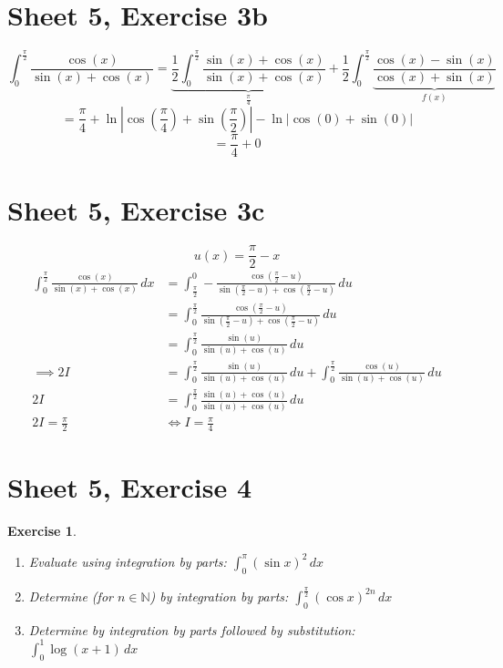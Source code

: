 \documentclass{article}
\newtheorem{ex}{Exercise} %
\newcommand{\card}[1]{\left|#1\right|}
\begin{document}
\section{Sheet 5, Exercise 3b}
\[
  \int_0^{\frac\pi2} \frac{\cos(x)}{\sin(x) + \cos(x)} = \underbrace{\frac12 \int_0^{\frac\pi2} \frac{\sin(x) + \cos(x)}{\sin(x) + \cos(x)}}_{\frac\pi4} + \frac12 \int_0^{\frac\pi2} \underbrace{\frac{\cos(x) - \sin(x)}{\cos(x) + \sin(x)}}_{f(x)}
\] \[
  = \frac\pi4 + \ln{\card{\cos(\frac\pi4) + \sin(\frac\pi2)} - \ln\card{\cos(0) + \sin(0)}}
\] \[
  = \frac\pi4 + 0
\]

\section{Sheet 5, Exercise 3c}
\[ u(x) = \frac\pi2 - x \]
\begin{align*}
  \int_0^{\frac\pi2} \frac{\cos(x)}{\sin(x) + \cos(x)} \, dx
  &= \int_{\frac\pi2}^0 -\frac{\cos(\frac\pi2 - u)}{\sin(\frac\pi2 - u) + \cos(\frac\pi2 - u)} \, du \\
  &= \int_0^{\frac\pi2} \frac{\cos(\frac\pi2 - u)}{\sin(\frac\pi2 - u) + \cos(\frac\pi2 - u)} \, du \\
  &= \int_0^{\frac\pi2} \frac{\sin(u)}{\sin(u) + \cos(u)} \, du \\
  \implies 2I &= \int_0^{\frac\pi2} \frac{\sin(u)}{\sin(u) + \cos(u)} \, du + \int_0^{\frac\pi2} \frac{\cos(u)}{\sin(u) + \cos(u)} \, du \\
  2I &= \int_0^{\frac\pi2} \frac{\sin(u) + \cos(u)}{\sin(u) + \cos(u)} \, du \\
  2I = \frac\pi2 &\iff I = \frac\pi4
\end{align*}

\section{Sheet 5, Exercise 4}
\begin{ex}
  \begin{enumerate}
    \item Evaluate using integration by parts: $\int_0^\pi (\sin{x})^2 \, dx$
    \item Determine (for $n \in \mathbb N$) by integration by parts: $\int_0^{\frac\pi2} (\cos{x})^{2n} \, dx$
    \item Determine by integration by parts followed by substitution: $\int_0^1 \log(x  + 1) \, dx$
  \end{enumerate}
\end{ex}
\end{document}
